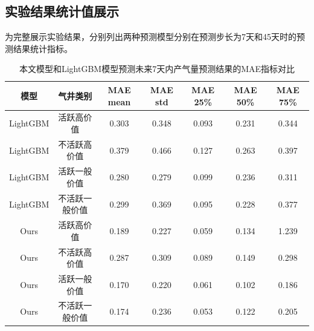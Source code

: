 \subsection{实验结果统计值展示}
为完整展示实验结果，分别列出两种预测模型分别在预测步长为7天和45天时的预测结果统计指标。
\begin{table}[H]
    \renewcommand{\arraystretch}{1.5}
    \centering
    \caption{本文模型和LightGBM模型预测未来7天内产气量预测结果的MAE指标对比}
    \label{tab:MAE7}
    \begin{tabular}{|c|c|c|c|c|c|c|}
    \hline
    模型     & 气井类别 & MAE mean & MAE std & MAE 25\% & MAE 50\% & MAE 75\% \\ \hline
    LightGBM  &活跃高价值       &0.303     & 0.348   & 0.093    & 0.231     &0.344 \\ \hline 
    LightGBM & 不活跃高价值      & 0.379    & 0.466   & 0.127    & 0.263    & 0.397    \\ \hline
    LightGBM & 活跃一般价值     & 0.280    & 0.279   & 0.099    & 0.236    & 0.311    \\ \hline
    LightGBM & 不活跃一般价值      & 0.299    & 0.369   & 0.095    & 0.228    & 0.377    \\ \hline
    Ours      & 活跃高价值         & 0.189    &0.227    &0.059     & 0.134     &1.239  \\ \hline
    Ours       & 不活跃高价值      & 0.287    & 0.309   & 0.089    & 0.149    & 0.298    \\ \hline
    Ours      & 活跃一般价值     & 0.170    & 0.220   & 0.061    & 0.102    & 0.186    \\ \hline
    Ours     & 不活跃一般价值     & 0.174    & 0.236   & 0.053    & 0.122    & 0.205    \\ \hline
    \end{tabular}
\end{table}
